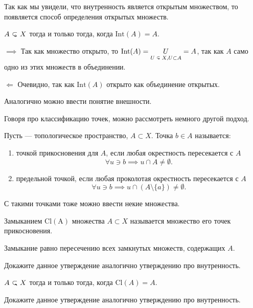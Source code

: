     Так как мы увидели, что внутренность является открытым множеством, то появляется способ определения открытых множеств.
    \begin{Prop}
        $A \open X$ тогда и только тогда, когда $\mathrm{Int} (A) = A$.
    \end{Prop}
    \begin{Proof}
        $\implies$ Так как множество открыто, то $\mathrm{Int} (A) = \underset{\tiny U\open X, U\subset A}{U} = A$, так как $A$ само одно из этих множеств в объединении.

        $\Longleftarrow$ Очевидно, так как $\mathrm{Int} (A)$ открыто как объединение открытых.
    \end{Proof}

    Аналогично можно ввести понятие внешности. 

    Говоря про классификацию точек, можно рассмотреть немного другой подход. 
    \begin{Def}
        Пусть \topX --- топологическое пространство,  $A \subset X$. Точка $b\in A$ называется:
        \begin{enumerate}
            \item точкой прикосновения для $A$, если любая окрестность пересекается с $A$
                \[
                \forall u \ni b \implies u \cap A \neq \emptyset.
                \] 
            \item предельной точкой, если любая проколотая окрестность пересекается с $A$
                \[
                    \forall u \ni b \implies u \cap (A \setminus \{a\}) \neq \emptyset.
                \] 
        \end{enumerate}
    \end{Def}
    С такими точками тоже можно ввести некие множества.
    \begin{Def}
        Замыканием $\mathrm{Cl(A)}$ множества $A \subset X$ называется множество его точек прикосновения.
    \end{Def}
    \begin{Prop}
        Замыкание равно пересечению всех замкнутых множеств, содержащих $A$.
    \end{Prop}
    \begin{Task}
        Докажите данное утверждение аналогично утверждению про внутренность.
    \end{Task}

    \begin{Prop}
        $A \closed X$ тогда и только тогда, когда $\mathrm{Cl}(A) = A$.
    \end{Prop}
    \begin{Task}
        Докажите данное утверждение аналогично утверждению про внутренность.
    \end{Task}

